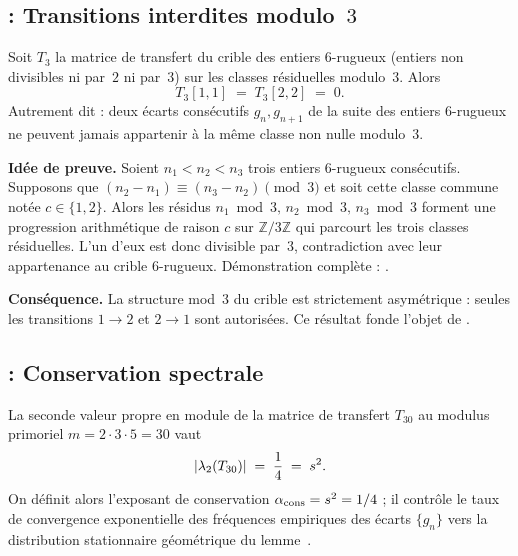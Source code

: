 \subsection{\Tone{} : Transitions interdites modulo~$3$}
\label{sec:theoremes:T1}

\begin{theoreme}
\label{thm:T1}
Soit $T_3$ la matrice de transfert du crible des entiers $6$-rugueux (entiers non divisibles ni par~$2$ ni par~$3$) sur les classes résiduelles modulo~$3$. Alors
\[
T_3[1,1] \;=\; T_3[2,2] \;=\; 0.
\]
Autrement dit : deux écarts consécutifs $g_n, g_{n+1}$ de la suite des entiers $6$-rugueux ne peuvent jamais appartenir à la même classe non nulle modulo~$3$.
\end{theoreme}

\textbf{Idée de preuve.} Soient $n_1 < n_2 < n_3$ trois entiers $6$-rugueux consécutifs. Supposons que $(n_2 - n_1) \equiv (n_3 - n_2) \pmod 3$ et soit cette classe commune notée $c \in \{1,2\}$. Alors les résidus $n_1 \bmod 3,\, n_2 \bmod 3,\, n_3 \bmod 3$ forment une progression arithmétique de raison $c$ sur $\mathbb{Z}/3\mathbb{Z}$ qui parcourt les trois classes résiduelles. L'un d'eux est donc divisible par~$3$, contradiction avec leur appartenance au crible $6$-rugueux. Démonstration complète : \cite[ch.~01]{PT_Monograph}.

\textbf{Conséquence.} La structure mod~$3$ du crible est strictement asymétrique : seules les transitions $1 \to 2$ et $2 \to 1$ sont autorisées. Ce résultat fonde l'objet de \Tthree{}.

\subsection{\Ttwo{} : Conservation spectrale}
\label{sec:theoremes:T2}

\begin{theoreme}
\label{thm:T2}
La seconde valeur propre en module de la matrice de transfert $T_{30}$ au modulus primoriel $m = 2 \cdot 3 \cdot 5 = 30$ vaut
\[
|\lambda_2(T_{30})| \;=\; \frac{1}{4} \;=\; s^2.
\]
On définit alors l'exposant de conservation $\alpha_{\rm cons} = s^2 = 1/4$ ; il contrôle le taux de convergence exponentielle des fréquences empiriques des écarts $\{g_n\}$ vers la distribution stationnaire géométrique du lemme~\Lzero.
\end{theoreme}

